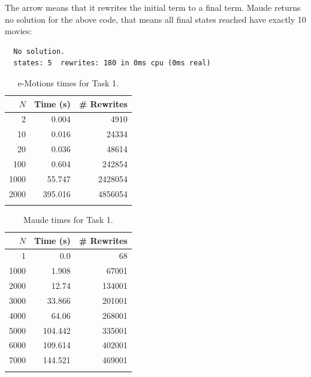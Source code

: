 The arrow \code{=>!} means that it rewrites the initial term to a final term. Maude returns no solution for the above code, that means all final states reached have exactly 10 movies:
\begin{verbatim}
  No solution.
  states: 5  rewrites: 180 in 0ms cpu (0ms real)
\end{verbatim}

\begin{table}
  \begin{center}
	\begin{tabular}{r r r}
	$N$ & Time (s) & \# Rewrites \\
	\hline
	2 & 0.004 & 4910 \\
	10 & 0.016 & 24334 \\
	20 & 0.036 & 48614 \\
	100 & 0.604 & 242854 \\
	1000 & 55.747 & 2428054 \\
	2000 & 395.016 & 4856054 \\
	\hline \\
	\end{tabular}
	\caption{e-Motions times for Task 1.}\label{table:emotionstask1}
	\end{center}
\end{table}

\begin{table}
  \begin{center}
	\begin{tabular}{r r r}
	$N$ & Time (s) & \# Rewrites \\
	\hline
	1 & 0.0 & 68 \\
	1000 & 1.908 & 67001 \\
	2000 & 12.74 & 134001 \\
	3000 & 33.866 & 201001 \\
	4000 & 64.06 & 268001 \\
	5000 & 104.442 & 335001 \\
	6000 & 109.614 & 402001 \\
	7000 & 144.521 & 469001 \\
	\hline \\
	\end{tabular}
	\caption{Maude times for Task 1.}\label{table:maudetask1}
	\end{center}
\end{table}

